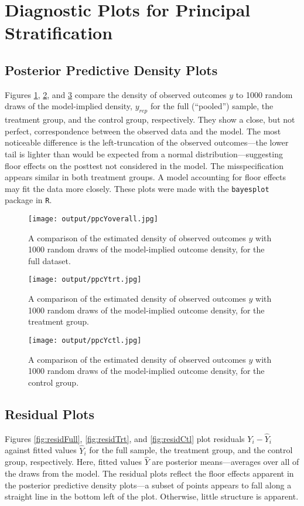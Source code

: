 \documentclass{article}\usepackage[]{graphicx}\usepackage[]{color}
\begin{document}
\section{Diagnostic Plots for Principal Stratification}



\subsection{Posterior Predictive Density Plots}
Figures \ref{fig:ppdPooled}, \ref{fig:ppdTrt}, and \ref{fig:ppdCtl}
compare the density of observed outcomes $y$ to 1000 random draws of
the model-implied density, $y_{rep}$ for the full (``pooled'') sample,
the treatment group, and the control group, respectively.
They show a close, but not perfect, correspondence between the
observed data and the model.
The most noticeable difference is the left-truncation of the observed
outcomes---the lower tail is lighter than would be expected from a
normal distribution---suggesting floor effects on the posttest not
considered in the model.
The misspecification appears similar in both treatment groups.
A model accounting for floor effects may fit the data more closely.
These plots were made with the \texttt{bayesplot} package
\citep{bayesplot} in \texttt{R}.

\begin{figure}[!h]
\centering
\texttt{[image: output/ppcYoverall.jpg]}
\caption{A comparison of the estimated density of observed outcomes
  $y$ with 1000 random draws of the model-implied outcome density,
  for the full dataset.}
\label{fig:ppdPooled}
\end{figure}

\begin{figure}[!h]
\centering
\texttt{[image: output/ppcYtrt.jpg]}
\caption{A comparison of the estimated density of observed outcomes
  $y$ with 1000 random draws of the model-implied outcome density,
  for the treatment group.}
\label{fig:ppdTrt}
\end{figure}

\begin{figure}[!h]
\centering
\texttt{[image: output/ppcYctl.jpg]}
\caption{A comparison of the estimated density of observed outcomes
  $y$ with 1000 random draws of the model-implied outcome density,
  for the control group.}
\label{fig:ppdCtl}
\end{figure}

\subsection{Residual Plots}
Figures \ref{fig:residFull}, \ref{fig:residTrt}, and
\ref{fig:residCtl} plot residuals $Y_i-\hat{Y}_i$ against fitted
values $\hat{Y}_i$ for the full sample, the treatment group, and the
control group, respectively.
Here, fitted values $\hat{Y}$ are posterior means---averages over all
of the draws from the model.
The residual plots reflect the floor effects apparent in the posterior
predictive density plots---a subset of points appears to fall along a
straight line in the bottom left of the plot.
Otherwise, little structure is apparent.
\end{document}

